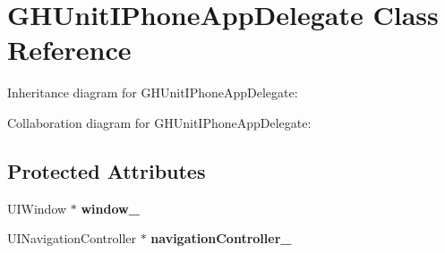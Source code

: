 \hypertarget{interface_g_h_unit_i_phone_app_delegate}{
\section{\-G\-H\-Unit\-I\-Phone\-App\-Delegate \-Class \-Reference}
\label{interface_g_h_unit_i_phone_app_delegate}
}


\-Inheritance diagram for \-G\-H\-Unit\-I\-Phone\-App\-Delegate\-:


\-Collaboration diagram for \-G\-H\-Unit\-I\-Phone\-App\-Delegate\-:
\subsection*{\-Protected \-Attributes}
\begin{DoxyCompactItemize}
\item 
\hypertarget{interface_g_h_unit_i_phone_app_delegate_a46ffe54ea9af323705825646794418ed}{
\-U\-I\-Window $\ast$ {\bfseries window\-\_\-}}
\label{interface_g_h_unit_i_phone_app_delegate_a46ffe54ea9af323705825646794418ed}

\item 
\hypertarget{interface_g_h_unit_i_phone_app_delegate_a112e4ac628b8fac90ea59c98fdde252e}{
\-U\-I\-Navigation\-Controller $\ast$ {\bfseries navigation\-Controller\-\_\-}}
\label{interface_g_h_unit_i_phone_app_delegate_a112e4ac628b8fac90ea59c98fdde252e}

\end{DoxyCompactItemize}



